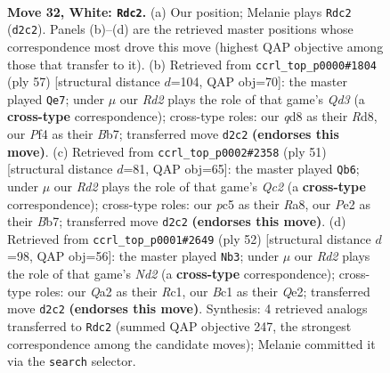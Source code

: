 \documentclass[11pt]{article}
\begin{document}
\clearpage

\begin{figure}[p]\centering
\begin{subfigure}{0.46\textwidth}\centering
\resizebox{\linewidth}{!}{%
\newchessgame
\chessboard[
  setfen={1rbq2k1/p1n1brn1/7p/P1p2p2/3p1Pp1/1P4P1/QR1RP1BP/2BNN1K1 w - - 2 32},
  showmover=false,
  pgfstyle=straightmove, color=movearrow, markmove={d2-c2}
]}
\caption{}
\end{subfigure}\hfill
\begin{subfigure}{0.46\textwidth}\centering
\resizebox{\linewidth}{!}{%
\newchessgame
\chessboard[
  setfen={3r2k1/1b1r1p2/pp1qnbp1/3p3p/1P6/P3PP1P/B2RNBP1/2RQ2K1 b - - 10 29},
  showmover=false,
  pgfstyle=straightmove, color=movearrow, markmove={d6-e7}
]}
\caption{}
\end{subfigure}
\\[4pt]
\begin{subfigure}{0.46\textwidth}\centering
\resizebox{\linewidth}{!}{%
\newchessgame
\chessboard[
  setfen={r1r4k/1bqnb1pp/4p3/p2pPp2/3P1P2/3BB3/RP3NPP/R2Q2K1 b - - 0 26},
  showmover=false,
  pgfstyle=straightmove, color=movearrow, markmove={c7-b6}
]}
\caption{}
\end{subfigure}\hfill
\begin{subfigure}{0.46\textwidth}\centering
\resizebox{\linewidth}{!}{%
\newchessgame
\chessboard[
  setfen={r5k1/1pb2rp1/2ppq1np/5b2/P1P1p3/2B1P1P1/3NQPBP/R1R3K1 w - - 2 27},
  showmover=false,
  pgfstyle=straightmove, color=movearrow, markmove={d2-b3}
]}
\caption{}
\end{subfigure}
\caption{\textbf{Move 32, White: \texttt{Rdc2}.} (a) Our position; Melanie plays \texttt{Rdc2} (\texttt{d2c2}). Panels (b)--(d) are the retrieved master positions whose correspondence most drove this move (highest QAP objective among those that transfer to it). (b) Retrieved from \texttt{ccrl\_top\_p0000\#1804} (ply 57) [structural distance $d$=104, QAP obj=70]: the master played \texttt{Qe7}; under $\mu$ our \emph{Rd2} plays the role of that game's \emph{Qd3} (a \textbf{cross-type} correspondence); cross-type roles: our \emph{q}d8 as their \emph{R}d8, our \emph{P}f4 as their \emph{B}b7; transferred move \texttt{d2c2} \textbf{(endorses this move)}. (c) Retrieved from \texttt{ccrl\_top\_p0002\#2358} (ply 51) [structural distance $d$=81, QAP obj=65]: the master played \texttt{Qb6}; under $\mu$ our \emph{Rd2} plays the role of that game's \emph{Qc2} (a \textbf{cross-type} correspondence); cross-type roles: our \emph{p}c5 as their \emph{R}a8, our \emph{P}e2 as their \emph{B}b7; transferred move \texttt{d2c2} \textbf{(endorses this move)}. (d) Retrieved from \texttt{ccrl\_top\_p0001\#2649} (ply 52) [structural distance $d$=98, QAP obj=56]: the master played \texttt{Nb3}; under $\mu$ our \emph{Rd2} plays the role of that game's \emph{Nd2} (a \textbf{cross-type} correspondence); cross-type roles: our \emph{Q}a2 as their \emph{R}c1, our \emph{B}c1 as their \emph{Q}e2; transferred move \texttt{d2c2} \textbf{(endorses this move)}. Synthesis: 4 retrieved analogs transferred to \texttt{Rdc2} (summed QAP objective 247, the strongest correspondence among the candidate moves); Melanie committed it via the \texttt{search} selector.}
\label{fig:thought-m62}
\end{figure}
\end{document}
